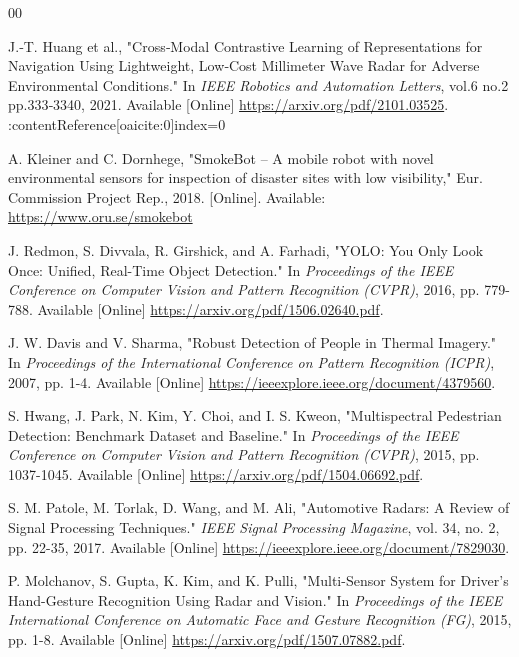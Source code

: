 \documentclass[conference]{IEEEtran}
\begin{document}
\begin{thebibliography}{00}

J.‑T. Huang et al., "Cross‑Modal Contrastive Learning of Representations for Navigation Using Lightweight, Low‑Cost Millimeter Wave Radar for Adverse Environmental Conditions." In \textit{IEEE Robotics and Automation Letters}, vol.6 no.2 pp.333‑3340, 2021. Available [Online] \href{https://arxiv.org/pdf/2101.03525}{https://arxiv.org/pdf/2101.03525}. :contentReference[oaicite:0]{index=0}

A. Kleiner and C. Dornhege, "SmokeBot – A mobile robot with novel environmental sensors for inspection of disaster sites with low visibility," Eur. Commission Project Rep., 2018. [Online]. Available: \url{https://www.oru.se/smokebot}

J. Redmon, S. Divvala, R. Girshick, and A. Farhadi, 
"YOLO: You Only Look Once: Unified, Real-Time Object Detection." 
In \textit{Proceedings of the IEEE Conference on Computer Vision and Pattern Recognition (CVPR)}, 2016, pp. 779-788. 
Available [Online] \href{https://arxiv.org/pdf/1506.02640.pdf}{https://arxiv.org/pdf/1506.02640.pdf}.

J. W. Davis and V. Sharma, 
"Robust Detection of People in Thermal Imagery." 
In \textit{Proceedings of the International Conference on Pattern Recognition (ICPR)}, 2007, pp. 1-4. 
Available [Online] \href{https://ieeexplore.ieee.org/document/4379560}{https://ieeexplore.ieee.org/document/4379560}.

S. Hwang, J. Park, N. Kim, Y. Choi, and I. S. Kweon, 
"Multispectral Pedestrian Detection: Benchmark Dataset and Baseline." 
In \textit{Proceedings of the IEEE Conference on Computer Vision and Pattern Recognition (CVPR)}, 2015, pp. 1037-1045. 
Available [Online] \href{https://arxiv.org/pdf/1504.06692.pdf}{https://arxiv.org/pdf/1504.06692.pdf}.

S. M. Patole, M. Torlak, D. Wang, and M. Ali, 
"Automotive Radars: A Review of Signal Processing Techniques." 
\textit{IEEE Signal Processing Magazine}, vol. 34, no. 2, pp. 22-35, 2017. 
Available [Online] \href{https://ieeexplore.ieee.org/document/7829030}{https://ieeexplore.ieee.org/document/7829030}.

P. Molchanov, S. Gupta, K. Kim, and K. Pulli, 
"Multi-Sensor System for Driver’s Hand-Gesture Recognition Using Radar and Vision." 
In \textit{Proceedings of the IEEE International Conference on Automatic Face and Gesture Recognition (FG)}, 2015, pp. 1-8. 
Available [Online] \href{https://arxiv.org/pdf/1507.07882.pdf}{https://arxiv.org/pdf/1507.07882.pdf}.


\end{thebibliography}
\end{document}
